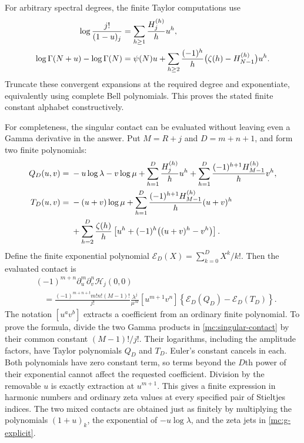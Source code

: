 For arbitrary spectral degrees, the finite Taylor computations use
\begin{align}\label{mc:harmonic-jets}
 \log\frac{j!}{(1-u)_j}&=\sum_{h\ge1}\frac{H_j^{(h)}}h u^h,\notag\\
 \log\Gamma(N+u)-\log\Gamma(N)
 &=\psi(N)u+
       \sum_{h\ge2}\frac{(-1)^h}{h}
                 \bigl(\zeta(h)-H_{N-1}^{(h)}\bigr)u^h.
\end{align}
Truncate these convergent expansions at the required degree and
exponentiate, equivalently using complete Bell polynomials.
This proves the stated finite constant alphabet constructively.

For completeness, the singular contact can be evaluated without
leaving even a Gamma derivative in the answer. Put $M=R+j$ and
$D=m+n+1$, and form two finite polynomials:
\begin{align}\label{mc:finite-logarithms}
 Q_D(u,v)={}&-u\log\lambda-v\log\mu
       +\sum_{h=1}^D\frac{H_j^{(h)}}h u^h
       +\sum_{h=1}^D\frac{(-1)^{h+1}H_{M-1}^{(h)}}h v^h,
       \notag\\
 T_D(u,v)={}&-(u+v)\log\mu
       +\sum_{h=1}^D\frac{(-1)^{h+1}H_{M-1}^{(h)}}h(u+v)^h
       \notag\\
 &+\sum_{h=2}^D\frac{\zeta(h)}h
          \left[u^h+(-1)^h\bigl((u+v)^h-v^h\bigr)\right].
\end{align}
Define the finite exponential polynomial
$\mathcal E_D(X)=\sum_{k=0}^D X^k/k!$.
Then the evaluated contact is
\begin{equation}\label{mc:finite-jet}
\begin{split}
 &(-1)^{m+n}\partial_u^m\partial_v^n\mathcal H_j(0,0)\\
 &\quad=
 \frac{(-1)^{m+n+t}m!n!(M-1)!}{j!}
     \frac{\lambda^j}{\mu^M}
 [u^{m+1}v^n]\left\{\mathcal E_D(Q_D)-\mathcal E_D(T_D)\right\}.
\end{split}
\end{equation}
The notation $[u^av^b]$ extracts a coefficient from an ordinary
finite polynomial. To prove the formula, divide the two Gamma products
in \eqref{mc:singular-contact} by their common constant $(M-1)!/j!$.
Their logarithms, including the amplitude factors, have Taylor
polynomials $Q_D$ and $T_D$. Euler's constant cancels in each.
Both polynomials have zero constant term, so terms beyond the $D$th
power of their exponential cannot affect the requested coefficient.
Division by the removable $u$ is exactly extraction at $u^{m+1}$.
This gives a finite expression in harmonic numbers and ordinary zeta
values at every specified pair of Stieltjes indices. The two mixed
contacts are obtained just as finitely by multiplying the polynomials
$(1+u)_k$, the exponential of $-u\log\lambda$, and the zeta jets
in \eqref{mc:g-explicit}.

